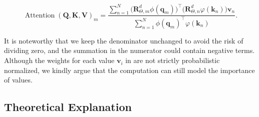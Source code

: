 \documentclass{article}
\def\q{{\boldsymbol q}}
\def\k{{\boldsymbol k}}
\def\v{{\boldsymbol v}}
\def\R{{\boldsymbol R}}
\begin{document}
\begin{equation}
	\operatorname{Attention}(\mathbf{Q},\mathbf{K},\mathbf{V})_m=\frac{\sum_{n=1}^{N}\big(\R^d_{\Theta, m}\phi(\q_m)\big)^{\intercal}\big(\R^d_{\Theta, n}\varphi(\k_n)\big)\v_n}{\sum_{n=1}^{N}\phi(\q_m)^{\intercal}\varphi(\k_n)}.
	\label{fn:linear-rope}
\end{equation}

It is noteworthy that we keep the denominator unchanged to avoid the risk of dividing zero, and the summation in the numerator could contain negative terms. Although the weights for each value $\v_i$ in   are not strictly probabilistic normalized, we kindly argue that the computation can still model the importance of values. 
\subsection{Theoretical Explanation}
\end{document}
